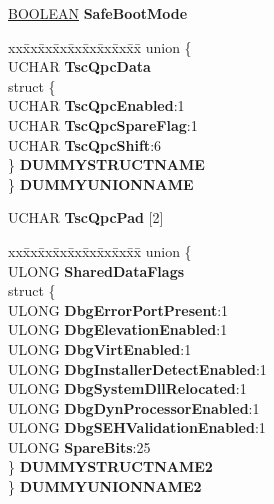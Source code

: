 \begin{DoxyCompactItemize}
\hyperlink{_processor_bind_8h_a112e3146cb38b6ee95e64d85842e380a}{B\+O\+O\+L\+E\+AN} {\bfseries Safe\+Boot\+Mode}
\item 
\mbox{\label{struct___k_u_s_e_r___s_h_a_r_e_d___d_a_t_a_a726662244cbfa8d507aeb89844d46068}} 
\begin{tabbing}
xx\=xx\=xx\=xx\=xx\=xx\=xx\=xx\=xx\=\kill
union \{\\
\>UCHAR {\bfseries TscQpcData}\\
\>struct \{\\
\>\>UCHAR {\bfseries TscQpcEnabled}:1\\
\>\>UCHAR {\bfseries TscQpcSpareFlag}:1\\
\>\>UCHAR {\bfseries TscQpcShift}:6\\
\>\} {\bfseries DUMMYSTRUCTNAME}\\
\} {\bfseries DUMMYUNIONNAME}\\

\end{tabbing}\item 
\mbox{\label{struct___k_u_s_e_r___s_h_a_r_e_d___d_a_t_a_a9e16e680b74d0122347aaeada91d5b9d}} 
U\+C\+H\+AR {\bfseries Tsc\+Qpc\+Pad} \mbox{[}2\mbox{]}
\item 
\mbox{\label{struct___k_u_s_e_r___s_h_a_r_e_d___d_a_t_a_a10d465ff343065145eb5274f84810676}} 
\begin{tabbing}
xx\=xx\=xx\=xx\=xx\=xx\=xx\=xx\=xx\=\kill
union \{\\
\>ULONG {\bfseries SharedDataFlags}\\
\>struct \{\\
\>\>ULONG {\bfseries DbgErrorPortPresent}:1\\
\>\>ULONG {\bfseries DbgElevationEnabled}:1\\
\>\>ULONG {\bfseries DbgVirtEnabled}:1\\
\>\>ULONG {\bfseries DbgInstallerDetectEnabled}:1\\
\>\>ULONG {\bfseries DbgSystemDllRelocated}:1\\
\>\>ULONG {\bfseries DbgDynProcessorEnabled}:1\\
\>\>ULONG {\bfseries DbgSEHValidationEnabled}:1\\
\>\>ULONG {\bfseries SpareBits}:25\\
\>\} {\bfseries DUMMYSTRUCTNAME2}\\
\} {\bfseries DUMMYUNIONNAME2}\\


\end{tabbing}
\end{DoxyCompactItemize}
